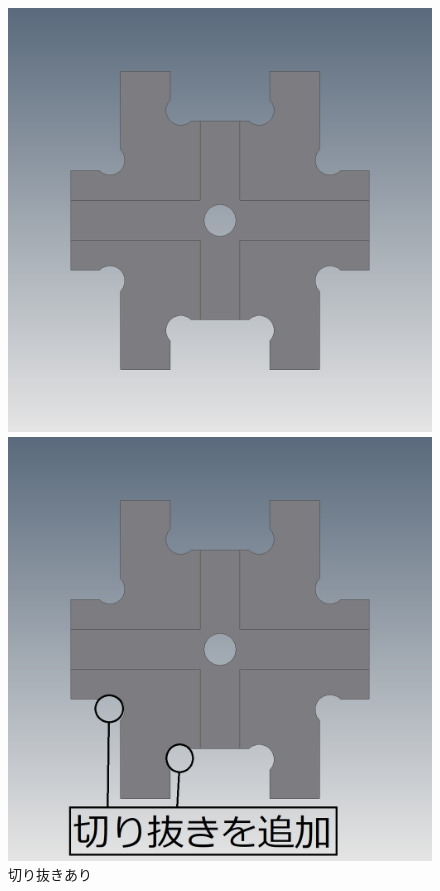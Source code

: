 \documentclass[b5paper, 9pt, twocolumn, titlepage,openany]{jsbook}%
\begin{document}

\begin{figure}[tbh]
  \begin{center}
    \begin{minipage}{0.4\columnwidth}
      \includegraphics[width=\columnwidth]{piece_1_ue3.png}
    \end{minipage}
    \hspace{0.05\columnwidth}
    \begin{minipage}{0.4\columnwidth}
      \includegraphics[width=\columnwidth]{piece_1_ue6.png}
    \end{minipage}
    \caption{切り抜きあり    \label{kirinuki}}
  \end{center}
\end{figure}
\end{document}
